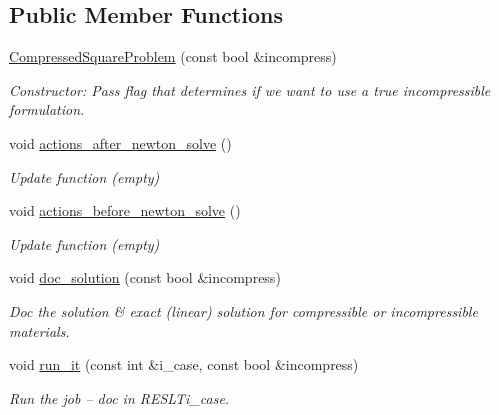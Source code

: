 \subsection*{Public Member Functions}
\begin{DoxyCompactItemize}
\item 
\hyperlink{classCompressedSquareProblem_af013df43f2a9f6ee8ff16cf59ddd9439}{Compressed\+Square\+Problem} (const bool \&incompress)
\begin{DoxyCompactList}\small\item\em Constructor\+: Pass flag that determines if we want to use a true incompressible formulation. \end{DoxyCompactList}\item 
void \hyperlink{classCompressedSquareProblem_afef46d13ff7c8b2845e96a84762077dc}{actions\+\_\+after\+\_\+newton\+\_\+solve} ()
\begin{DoxyCompactList}\small\item\em Update function (empty) \end{DoxyCompactList}\item 
void \hyperlink{classCompressedSquareProblem_aed8338e212b31c56a5df20c222385e15}{actions\+\_\+before\+\_\+newton\+\_\+solve} ()
\begin{DoxyCompactList}\small\item\em Update function (empty) \end{DoxyCompactList}\item 
void \hyperlink{classCompressedSquareProblem_a34d511f377379122d65b2a1402898f5c}{doc\+\_\+solution} (const bool \&incompress)
\begin{DoxyCompactList}\small\item\em Doc the solution \& exact (linear) solution for compressible or incompressible materials. \end{DoxyCompactList}\item 
void \hyperlink{classCompressedSquareProblem_a1543bb8bcba7bf3491e29d141faaf774}{run\+\_\+it} (const int \&i\+\_\+case, const bool \&incompress)
\begin{DoxyCompactList}\small\item\em Run the job -- doc in R\+E\+S\+L\+Ti\+\_\+case. \end{DoxyCompactList}\end{DoxyCompactItemize}
